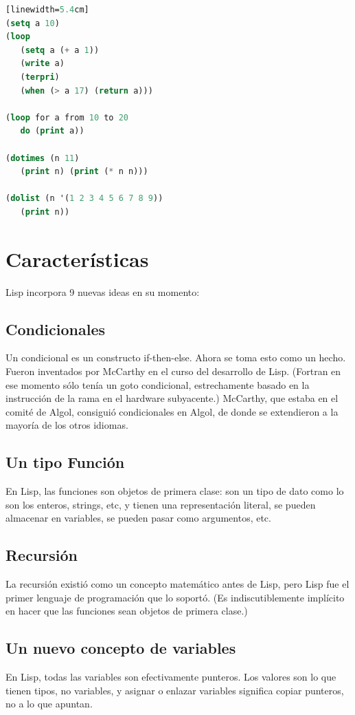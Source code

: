 \documentclass[10pt,journal,compsoc]{IEEEtran}
\begin{document}
\begin{lstlisting}[language=Lisp, caption = {Ejemplos de ciclos}][linewidth=5.4cm]
(setq a 10)
(loop 
   (setq a (+ a 1))
   (write a)
   (terpri)
   (when (> a 17) (return a)))
   
(loop for a from 10 to 20
   do (print a))
   
(dotimes (n 11)
   (print n) (print (* n n)))   
   
(dolist (n '(1 2 3 4 5 6 7 8 9))
   (print n))
\end{lstlisting}

\section{Caracter\'isticas}
Lisp incorpora 9 nuevas ideas en su momento:
\subsection{Condicionales}
Un condicional es un constructo if-then-else. Ahora se toma esto como un hecho. Fueron inventados por McCarthy en el curso del desarrollo de Lisp. (Fortran en ese momento s\'olo ten\'ia un goto condicional, estrechamente basado en la instrucci\'on de la rama en el hardware subyacente.) McCarthy, que estaba en el comit\'e de Algol, consigui\'o condicionales en Algol, de donde se extendieron a la mayor\'ia de los otros idiomas.

\subsection{Un tipo Funci\'on}
En Lisp, las funciones son objetos de primera clase: son un tipo de dato como lo son los enteros, strings, etc, y tienen una representaci\'on literal, se pueden almacenar en variables, se pueden pasar como argumentos, etc.

\subsection{Recursi\'on}
La recursi\'on existi\'o como un concepto matem\'atico antes de Lisp, pero Lisp fue el primer lenguaje de programaci\'on que lo soport\'o. (Es indiscutiblemente impl\'icito en hacer que las funciones sean objetos de primera clase.)

\subsection{Un nuevo concepto de variables}
En Lisp, todas las variables son efectivamente punteros. Los valores son lo que tienen tipos, no variables, y asignar o enlazar variables significa copiar punteros, no a lo que apuntan.
\end{document}
